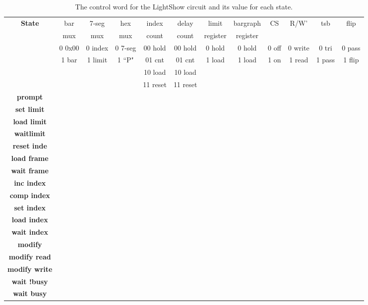 \begin{description}
\begin{landscape}
\begin{table}
{\small
\begin{tabular}{c||c|c|c|c|c|c|c|c|c|c|c}
\textbf{ State } 	& bar & 7-seg & hex & index & delay & limit    & bargraph & CS & R/W' & tsb & flip \\  
    & mux & mux   & mux & count & count & register & register &       &       & &      \\  \hline \hline
    & 0 0x00 & 0 index & 0 7-seg & 00 hold & 00 hold & 0 hold & 0 hold & 0 off & 0 write & 0 tri & 0 pass \\ 
    & 1 bar	& 1 limit & 1 ``P"& 01 cnt & 01 cnt & 1 load &    1 load & 1 on    &  1 read & 1 pass & 1 flip \\
    & 	&     &     & 10 load & 10 load & & & & & \\
    & 	&     &	    & 11 reset	& 11 reset & & & & \\ \hline \hline
\textbf{ prompt } 	 & 	  &	  &	  &	   &	   &	  &	  &	  &   &	  &   \\ \hline
\textbf{ set limit }  & 	  &	  &	  &	   &	   &	  &	  &	  &   &	  &   \\ \hline
\textbf{ load limit } &	  &	  &	  &	   &	   &	  &	  &	  &   &	  &   \\ \hline
\textbf{ waitlimit } &	  &	  &	  &	   &	   &	  &	  &	  &   &	  &   \\ \hline
\textbf{ reset inde  } &	  &	  & 	  &	   &	   &	  &	  &	  &   &	  &   \\ \hline
\textbf{ load frame } &	  &	  &	  &	   &	   &	  &	  &	  &   &   &   \\ \hline
\textbf{ wait frame } &	  &	  &	  &	   &	   &	  &	  &	  &   &	  &   \\ \hline
\textbf{ inc index } &	  &	  &	  &	   &	   &	  &	  &	  &   &	  &   \\ \hline
\textbf{ comp index } &	  &	  &	  &	   &	   &	  &	  &	  &   &	  &   \\ \hline
\textbf{ set index } &	  &	  &	  &	   & 	   &	  & 	  &	  &   &	  &   \\ \hline
\textbf{ load index } &	  &	  & 	  &	   &	   &	  &	  &	  &   &   &   \\ \hline
\textbf{ wait index } &	  &	  &	  &	   &	   &	  &	  &	  &   &	  &   \\ \hline
\textbf{ modify	} &	  &	  &	  &	   &	   &	  &	  &	  &   &	  &   \\ \hline
\textbf{ modify read} &	  &	  &	  &	   &	   &	  &	  &	  &   &	  &   \\ \hline
\textbf{ modify write } &	  &	  &	  &	   &	   &	  &	  & 	  &   &	  &   \\ \hline
\textbf{ wait !busy } &	  &	  &	  &	   &	   &	  &	  &	  &   &	  &   \\ \hline
\textbf{ wait busy } &	  &	  &	  &	   &	   &	  &	  &	  &   &	  &   \\ 
\end{tabular} 
}
\caption{The control word for the LightShow circuit and its value for each state.}
\label{table:LightShow}
\end{table}

\end{landscape}


\end{description}
